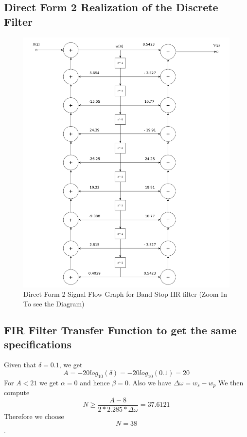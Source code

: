 \documentclass[22pt]{article}
\begin{document}
\subsection{Direct Form 2 Realization of the Discrete Filter}
\begin{figure}[H]
  \centering
  \includegraphics[scale=0.3]{images/direct_form2_bs}
  \caption{Direct Form 2 Signal Flow Graph for Band Stop IIR filter (Zoom In To see the Diagram)}
  \label{fig:15}
\end{figure}
\newpage
\subsection{FIR Filter Transfer Function to get the same specifications}
Given that $\delta = 0.1$, we get $$A = -20log_{10}(\delta) = -20log_{10}(0.1) = 20$$
For  $A < 21$ we get $\alpha = 0$ and hence $\beta = 0$.
Also we have $\Delta\omega = w_s - w_p$
We then compute $$N \ge \frac{A-8}{2*2.285*\Delta\omega} = 37.6121$$
Therefore we choose $$N = 38$$.
\end{document}
